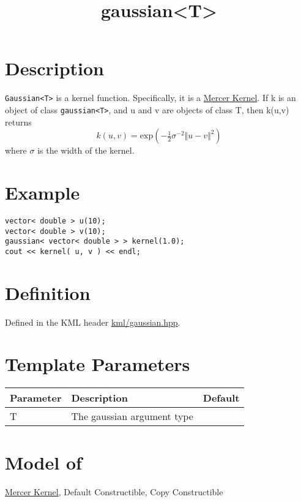 \documentclass{article}
\newcommand{\half}{\tfrac{1}{2}}
\begin{document}
\title{gaussian<T>}
\maketitle

\section*{Description}

\texttt{Gaussian<T>} is a kernel function. Specifically, it is a \href{\kmlroot/mercer_kernel.html}{Mercer Kernel}. If k is an object of class \texttt{gaussian<T>}, and u and v are objects of class T, then k(u,v) returns
%
$$k(u,v) = \textrm{exp}( - \half \sigma^{-2} \Vert u-v \Vert^2 ) $$
%
where $\sigma$ is the width of the kernel. 


\section*{Example}


\highlightcpp{}
\begin{verbatim}
vector< double > u(10);
vector< double > v(10);
gaussian< vector< double > > kernel(1.0);
cout << kernel( u, v ) << endl;
\end{verbatim}


\section*{Definition}

Defined in the KML header \href{\kmlroot/gaussian.hpp}{kml/gaussian.hpp}.


\section*{Template Parameters}

\begin{tabular}{lll}
\textbf{Parameter} & \textbf{Description} & \textbf{Default} \\ 
\hline
T & The gaussian argument type \\ 
\end{tabular}


\section*{Model of}

\href{\kmlroot/mercer_kernel.html}{Mercer Kernel}, 
Default Constructible, Copy Constructible
\end{document}
